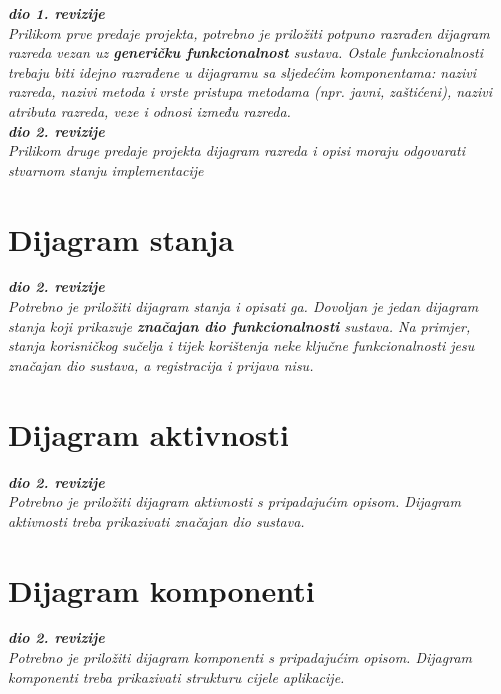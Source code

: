 			\textbf{\textit{dio 1. revizije}}\\
			
			\textit{Prilikom prve predaje projekta, potrebno je priložiti potpuno razrađen dijagram razreda vezan uz \textbf{generičku funkcionalnost} sustava. Ostale funkcionalnosti trebaju biti idejno razrađene u dijagramu sa sljedećim komponentama: nazivi razreda, nazivi metoda i vrste pristupa metodama (npr. javni, zaštićeni), nazivi atributa razreda, veze i odnosi između razreda.}\\
			
			\textbf{\textit{dio 2. revizije}}\\			
			
			\textit{Prilikom druge predaje projekta dijagram razreda i opisi moraju odgovarati stvarnom stanju implementacije}
			
			
			
			\eject
		
		\section{Dijagram stanja}
			
			
			\textbf{\textit{dio 2. revizije}}\\
			
			\textit{Potrebno je priložiti dijagram stanja i opisati ga. Dovoljan je jedan dijagram stanja koji prikazuje \textbf{značajan dio funkcionalnosti} sustava. Na primjer, stanja korisničkog sučelja i tijek korištenja neke ključne funkcionalnosti jesu značajan dio sustava, a registracija i prijava nisu. }
			
			
			\eject 
		
		\section{Dijagram aktivnosti}
			
			\textbf{\textit{dio 2. revizije}}\\
			
			 \textit{Potrebno je priložiti dijagram aktivnosti s pripadajućim opisom. Dijagram aktivnosti treba prikazivati značajan dio sustava.}
			
			\eject
		\section{Dijagram komponenti}
		
			\textbf{\textit{dio 2. revizije}}\\
		
			 \textit{Potrebno je priložiti dijagram komponenti s pripadajućim opisom. Dijagram komponenti treba prikazivati strukturu cijele aplikacije.}
